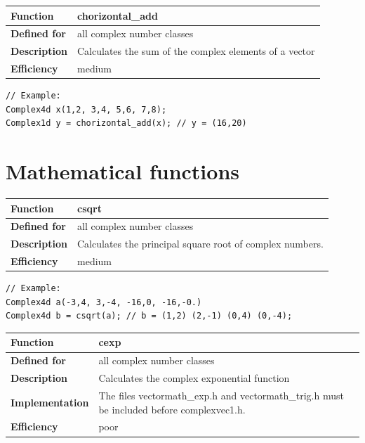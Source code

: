\documentclass[11pt,a4paper,oneside,openright]{report}
\newcommand{\vspacesmall}{\vspace{3mm}}
\newcommand{\vspacebig}{\vspace{6mm}}
\begin{document}
\begin{tabular}{|p{28mm}|p{100mm}|}
\hline
\bfseries Function & chorizontal\_add \\ \hline
\bfseries Defined for & all complex number classes  \\ \hline
\bfseries Description & Calculates the sum of the complex elements of a vector \\ \hline
\bfseries Efficiency & medium \\ \hline
\end{tabular}
\vspacesmall

\begin{lstlisting}[frame=none]
// Example:
Complex4d x(1,2, 3,4, 5,6, 7,8);
Complex1d y = chorizontal_add(x); // y = (16,20)
\end{lstlisting}
\vspacebig


\chapter{Mathematical functions}\label{chap:MathematicalFunctions}

\begin{tabular}{|p{25mm}|p{100mm}|}
\hline
\bfseries Function & csqrt \\ \hline
\bfseries Defined for & all complex number classes  \\ \hline
\bfseries Description & Calculates the principal square root of complex numbers. \\ \hline
\bfseries Efficiency & medium \\ \hline
\end{tabular}
\vspacesmall

\begin{lstlisting}[frame=none]
// Example:
Complex4d a(-3,4, 3,-4, -16,0, -16,-0.)
Complex4d b = csqrt(a); // b = (1,2) (2,-1) (0,4) (0,-4);
\end{lstlisting}
\vspacebig


\begin{tabular}{|p{28mm}|p{100mm}|}
\hline
\bfseries Function & cexp \\ \hline
\bfseries Defined for & all complex number classes  \\ \hline
\bfseries Description & Calculates the complex exponential function \\ \hline
\bfseries Implementation & The files vectormath\_exp.h and vectormath\_trig.h
must be included before complexvec1.h. \\ \hline
\bfseries Efficiency & poor \\ \hline
\end{tabular}
\vspacesmall
\end{document}

